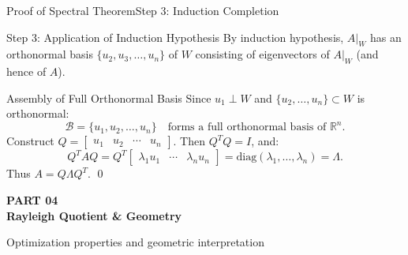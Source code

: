 \documentclass[10pt, aspectratio=169]{beamer}
\begin{document}
\begin{frame}{Proof of Spectral Theorem}{Step 3: Induction Completion}
  \begin{proofstep}{Step 3: Application of Induction Hypothesis}
    \small
    By induction hypothesis, $A|_W$ has an orthonormal basis $\{u_2, u_3, \dots, u_n\}$ of $W$ consisting of eigenvectors of $A|_W$ (and hence of $A$).
  \end{proofstep}

  \vspace*{0.1cm}

  \begin{conceptbox}{Assembly of Full Orthonormal Basis}
    \small
    Since $u_1 \perp W$ and $\{u_2, \dots, u_n\} \subset W$ is orthonormal:
    \[
      \mathcal{B} = \{u_1, u_2, \dots, u_n\} \quad \text{forms a full orthonormal basis of } \mathbb{R}^n.
    \]
    Construct $Q = \begin{bmatrix} u_1 & u_2 & \cdots & u_n \end{bmatrix}$. Then $Q^T Q = I$, and:
    \[
      Q^T A Q = Q^T \begin{bmatrix} \lambda_1 u_1 & \cdots & \lambda_n u_n \end{bmatrix} = \mathrm{diag}(\lambda_1, \dots, \lambda_n) = \Lambda.
    \]
    Thus $A = Q \Lambda Q^T$. \qed
  \end{conceptbox}
\end{frame}

\begin{frame}[plain]
  \vspace*{1.8cm}
  \begin{center}
    {\color{teal}\small\bfseries PART 04} \\[0.2cm]
    {\color{navy}\huge\bfseries Rayleigh Quotient \& Geometry} \\[0.3cm]
    \par\vspace{0.3cm}
    {\color{slate}\small Optimization properties and geometric interpretation}
  \end{center}
\end{frame}
\end{document}

